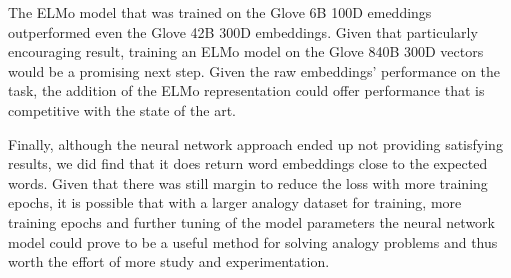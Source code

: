 \documentclass[11pt]{article}
\begin{document}
The ELMo model that was trained on the Glove 6B 100D emeddings
outperformed even the Glove 42B 300D embeddings. Given that particularly
encouraging result, training an ELMo model on the Glove 840B 300D
vectors would be a promising next step. Given the raw embeddings'
performance on the task, the addition of the ELMo representation could
offer performance that is competitive with the state of the art.

Finally, although the neural network approach ended up not providing
satisfying results, we did find that it does return word embeddings
close to the expected words. Given that there was still margin to reduce
the loss with more training epochs, it is possible that with a larger
analogy dataset for training, more training epochs and further tuning of
the model parameters the neural network model could prove to be a useful
method for solving analogy problems and thus worth the effort of more
study and experimentation.
\end{document}
